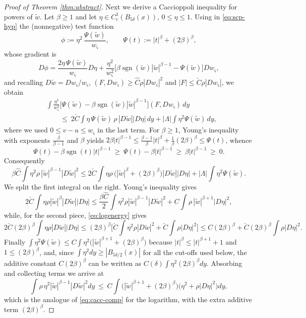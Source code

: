 \documentclass[10pt,a4paper]{amsart}
\begin{document}
\begin{proof}[Proof of Theorem \ref{thm:abstract}]
Next we derive a Caccioppoli inequality for powers of $\widetilde w$. Let $\beta\ge1$ and let
$\eta\in C_c^1(B_{5\delta}(x))$, $0\le\eta\le1$. Using in \eqref{eq:scp-hyp} the (nonnegative) test
function
\[
\phi:=\eta^2\,\frac{\Psi(\widetilde w)}{w_\varsigma},\qquad \Psi(t):=|t|^{\beta}+(2\beta)^{\beta},
\]
whose gradient is
\[
D\phi=\frac{2\eta\,\Psi(\widetilde w)}{w_\varsigma}D\eta
+\frac{\eta^2}{w_\varsigma^{2}}\Big[\beta\operatorname{sgn}(\widetilde w)|\widetilde w|^{\beta-1}-\Psi(\widetilde w)\Big]Dw_\varsigma ,
\]
and recalling $D\widetilde w=Dw_\varsigma/w_\varsigma$, $(F,Dw_\varsigma)\ge\hat C\rho|Dw_\varsigma|^2$
and $|F|\le\check C\rho|Dw_\varsigma|$, we obtain
\begin{align*}
&\int\frac{\eta^2}{w_\varsigma^{2}}\Big[\Psi(\widetilde w)-\beta\operatorname{sgn}(\widetilde w)|\widetilde w|^{\beta-1}\Big](F,Dw_\varsigma)\,dy\\
&\qquad\le\ 2\check C\int\eta\,\Psi(\widetilde w)\,\rho\,|D\widetilde w||D\eta|\,dy
+|\Lambda|\int\eta^2\Psi(\widetilde w)\,dy ,
\end{align*}
where we used $0\le v-u\le w_\varsigma$ in the last term. For $\beta\ge1$, Young's inequality with
exponents $\frac{\beta}{\beta-1}$ and $\beta$ yields
$2\beta|t|^{\beta-1}\le\frac{\beta-1}{\beta}|t|^{\beta}+\frac1\beta(2\beta)^{\beta}\le\Psi(t)$,
whence
\begin{equation}\label{eq:elem}
\Psi(t)-\beta\operatorname{sgn}(t)|t|^{\beta-1}\ \ge\ \Psi(t)-\beta|t|^{\beta-1}\ \ge\ \beta|t|^{\beta-1}\ \ge\ 0 .
\end{equation}
Consequently
\[
\beta\hat C\int\eta^2\rho\,|\widetilde w|^{\beta-1}|D\widetilde w|^2
\le 2\check C\int\eta\rho\,\big(|\widetilde w|^{\beta}+(2\beta)^{\beta}\big)|D\widetilde w||D\eta|
+|\Lambda|\int\eta^2\Psi(\widetilde w) .
\]
We split the first integral on the right. Young's inequality gives
\[
2\check C\int\eta\rho|\widetilde w|^{\beta}|D\widetilde w||D\eta|
\le\frac{\beta\hat C}{2}\int\eta^2\rho|\widetilde w|^{\beta-1}|D\widetilde w|^2
+C\int\rho\,|\widetilde w|^{\beta+1}|D\eta|^2 ,
\]
while, for the second piece, \eqref{eq:logenergy} gives
\[
2\check C(2\beta)^{\beta}\int\eta\rho|D\widetilde w||D\eta|
\le (2\beta)^{\beta}\Big[\check C\int\eta^2\rho|D\widetilde w|^2+\check C\int\rho|D\eta|^2\Big]
\le C(2\beta)^{\beta}+\check C(2\beta)^\beta\int\rho|D\eta|^2 .
\]
Finally $\int\eta^2\Psi(\widetilde w)\le C\int\eta^2\big(|\widetilde w|^{\beta+1}+(2\beta)^{\beta}\big)$
because $|t|^{\beta}\le|t|^{\beta+1}+1$ and $1\le(2\beta)^{\beta}$, and, since
$\int\eta^2 dy\ge|B_{5\delta/2}(x)|$ for all the cut-offs used below, the additive constant
$C(2\beta)^{\beta}$ can be written as $C(\delta)\int\eta^2(2\beta)^{\beta}dy$. Absorbing and
collecting terms we arrive at
\begin{equation}\label{eq:cacc-log-beta}
\int\rho\,\eta^2|\widetilde w|^{\beta-1}|D\widetilde w|^2dy\ \le\
C\int\big(|\widetilde w|^{\beta+1}+(2\beta)^{\beta}\big)\big(\eta^2+\rho|D\eta|^2\big)dy ,
\end{equation}
which is the analogue of \eqref{eq:cacc-comp} for the logarithm, with the extra additive term
$(2\beta)^{\beta}$.


\end{proof}
\end{document}
